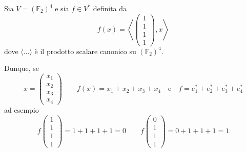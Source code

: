 \documentclass[../main.tex]{subfiles}
\begin{document}
\begin{example}
    Sia $V = (\mathbb{F}_2)^4$ e sia $f \in V^*$ definita da
    \begin{equation*}
        f(x) = \left\langle\begin{pmatrix}
            1 \\
            1 \\
            1 \\
            1
        \end{pmatrix}, x \right\rangle
    \end{equation*}
    dove $\langle \ldots \rangle$ è il prodotto scalare canonico su $(\mathbb{F}_2)^4$.

    Dunque, se
    \begin{equation*}
        x = \begin{pmatrix}
            x_1 \\
            x_2 \\
            x_3 \\
            x_4
        \end{pmatrix} \qquad f(x) = x_1 + x_2 + x_3 + x_4 \quad \text{e} \quad f = e^*_1 + e^*_2 + e^*_3 + e^*_4
    \end{equation*}
    ad esempio
    \begin{equation*}
        f\begin{pmatrix}
            1 \\
            1 \\
            1 \\
            1
        \end{pmatrix} = 1 + 1 + 1 + 1 = 0 \qquad
        f\begin{pmatrix}
            0 \\
            1 \\
            1 \\
            1
        \end{pmatrix} = 0 + 1 + 1 + 1 = 1
    \end{equation*}
\end{example}
\end{document}
